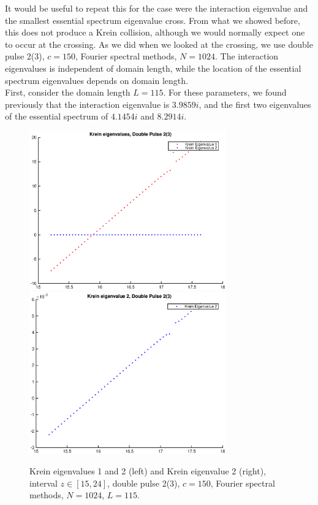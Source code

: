 \documentclass[12pt]{article}
\begin{document}
It would be useful to repeat this for the case were the interaction eigenvalue and the smallest essential spectrum eigenvalue cross. From what we showed before, this does not produce a Krein collision, although we would normally expect one to occur at the crossing. As we did when we looked at the crossing, we use double pulse 2(3), $c = 150$, Fourier spectral methods, $N = 1024$. The interaction eigenvalues is independent of domain length, while the location of the essential spectrum eigenvalues depends on domain length.\\

First, consider the domain length $L = 115$. For these parameters, we found previously that the interaction eigenvalue is $3.9859i$, and the first two eigenvalues of the essential spectrum of $4.1454i$ and $8.2914i$.

\begin{figure}[H]
	\includegraphics[width=8.5cm]{1500F_dp2_115_krein1.eps}
	\includegraphics[width=8.5cm]{1500F_dp2_115_krein2.eps}
	\caption{Krein eigenvalues 1 and 2 (left) and Krein eigenvalue 2 (right), interval $z \in [15, 24]$, double pulse 2(3), $c = 150$, Fourier spectral methods, $N = 1024$, $L = 115$. }
\end{figure}
\end{document}
